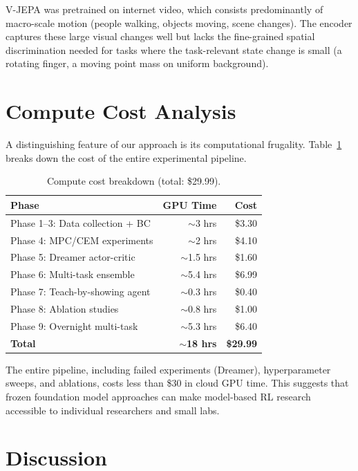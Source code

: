 \documentclass{article}
\begin{document}
V-JEPA was pretrained on internet video, which consists predominantly of macro-scale motion (people walking, objects moving, scene changes). The encoder captures these large visual changes well but lacks the fine-grained spatial discrimination needed for tasks where the task-relevant state change is small (a rotating finger, a moving point mass on uniform background).

\section{Compute Cost Analysis}

A distinguishing feature of our approach is its computational frugality. Table~\ref{tab:cost} breaks down the cost of the entire experimental pipeline.

\begin{table}[h]
\centering
\caption{Compute cost breakdown (total: \$29.99).}
\label{tab:cost}
\begin{tabular}{lrr}
\toprule
\textbf{Phase} & \textbf{GPU Time} & \textbf{Cost} \\
\midrule
Phase 1--3: Data collection + BC & $\sim$3 hrs & \$3.30 \\
Phase 4: MPC/CEM experiments & $\sim$2 hrs & \$4.10 \\
Phase 5: Dreamer actor-critic & $\sim$1.5 hrs & \$1.60 \\
Phase 6: Multi-task ensemble & $\sim$5.4 hrs & \$6.99 \\
Phase 7: Teach-by-showing agent & $\sim$0.3 hrs & \$0.40 \\
Phase 8: Ablation studies & $\sim$0.8 hrs & \$1.00 \\
Phase 9: Overnight multi-task & $\sim$5.3 hrs & \$6.40 \\
\midrule
\textbf{Total} & $\sim$\textbf{18 hrs} & \textbf{\$29.99} \\
\bottomrule
\end{tabular}
\end{table}

The entire pipeline, including failed experiments (Dreamer), hyperparameter sweeps, and ablations, costs less than \$30 in cloud GPU time. This suggests that frozen foundation model approaches can make model-based RL research accessible to individual researchers and small labs.

\section{Discussion}
\end{document}
